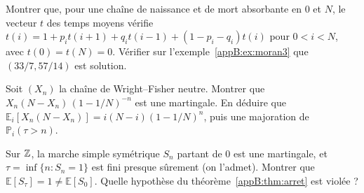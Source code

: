 \begin{exercise}
Montrer que, pour une chaîne de naissance et de mort absorbante en $0$ et $N$, le vecteur $t$ des temps moyens vérifie
$t(i)=1+p_it(i+1)+q_it(i-1)+(1-p_i-q_i)t(i)$ pour $0<i<N$, avec $t(0)=t(N)=0$. Vérifier sur l'exemple~\ref{appB:ex:moran3}
que $(33/7,57/14)$ est solution.
\end{exercise}

\begin{exercise}
Soit $(X_n)$ la chaîne de Wright--Fisher neutre. Montrer que $X_n(N-X_n)\,(1-1/N)^{-n}$ est une martingale. En déduire
que $\mathbb E_i[X_n(N-X_n)]=i(N-i)(1-1/N)^n$, puis une majoration de $\mathbb P_i(\tau>n)$.
\end{exercise}

\begin{exercise}
Sur $\mathbb{Z}$, la marche simple symétrique $S_n$ partant de $0$ est une martingale, et $\tau=\inf\{n:S_n=1\}$ est fini
presque sûrement (on l'admet). Montrer que $\mathbb E[S_\tau]=1\ne\mathbb E[S_0]$. Quelle hypothèse du
théorème~\ref{appB:thm:arret} est violée ?
\end{exercise}
